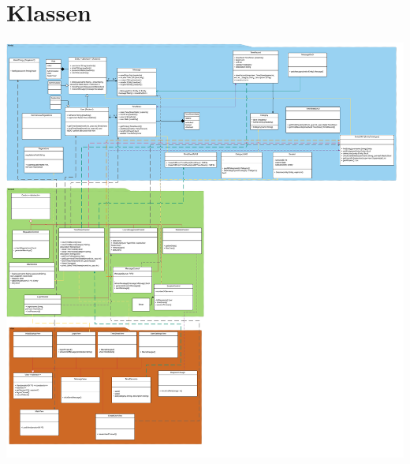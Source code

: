\section{Klassen}
    \includegraphics[width=\linewidth]{Diagramms/class/overview.png}\\
    \newpage
